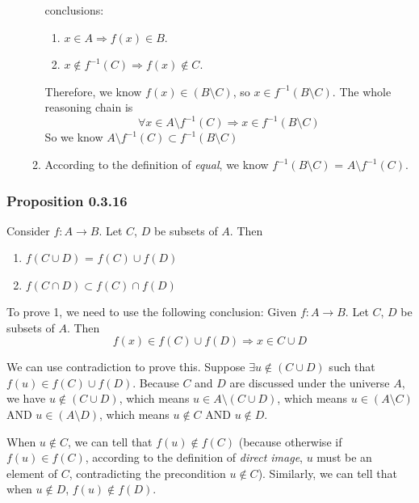 \documentclass[12pt, letterpaper, oneside]{book}
\begin{document}
\begin{enumerate}
\begin{enumerate}
        conclusions:
        \begin{enumerate}
          \item $x \in A \Rightarrow f(x) \in B$.
          \item $x \notin f^{-1}(C) \Rightarrow f(x) \notin C$.
        \end{enumerate}
        Therefore, we know $f(x) \in (B \setminus C)$, so $x \in f^{-1}(B
          \setminus C)$. The whole
        reasoning chain is
        \[
          \forall x \in A \setminus f^{-1}(C) \Rightarrow x \in f^{-1}(B
          \setminus C)
        \]
        So we know $A \setminus f^{-1}(C) \subset f^{-1}(B \setminus C)$
      \item According to the definition of \textit{equal}, we know $f^{-1}(B
        \setminus C)$ = $A \setminus f^{-1}(C)$.
    \end{enumerate}
\end{enumerate}

\subsubsection*{Proposition 0.3.16}

Consider $f: A \rightarrow B$. Let $C$, $D$ be subsets of $A$. Then
\begin{enumerate}
  \item $f(C \cup D)$ = $f(C) \cup f(D)$
  \item $f(C \cap D) \subset f(C) \cap f(D)$
\end{enumerate}

To prove 1, we need to use the following conclusion: Given $f: A \rightarrow B$.
Let $C$, $D$ be subsets of $A$. Then \[f(x) \in f(C) \cup f(D) \Rightarrow
x \in C \cup D\]

We can use contradiction to prove this. Suppose $\exists u \notin (C \cup D)$
such that $f(u) \in f(C) \cup f(D)$. Because $C$ and $D$ are discussed under
the universe $A$, we have $u \notin (C \cup D)$, which means $u \in A \setminus
(C \cup D)$, which means $u \in (A \setminus C)$ AND $u \in (A \setminus D)$,
which means $u \notin C$ AND $u \notin D$.

When $u \notin C$, we can tell that $f(u) \notin f(C)$ (because otherwise if
$f(u) \in f(C)$, according to the definition of \textit{direct image}, $u$ must
be an element of $C$, contradicting the precondition $u \notin C$). Similarly,
we can tell that when $u \notin D$, $f(u) \notin f(D)$.
\end{document}
